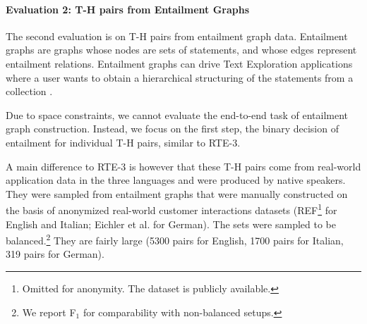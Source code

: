 \documentclass[11pt,letterpaper]{article}
\begin{document}
\paragraph{Evaluation 2: T-H pairs from Entailment Graphs} The second
evaluation is on T-H pairs from entailment graph data. Entailment
graphs are graphs whose nodes are sets of statements, and whose edges
represent entailment relations. Entailment graphs can drive Text
Exploration applications where a user wants to obtain a hierarchical
structuring of the statements from a collection
\cite{berant2012learning}.

Due to space constraints, we cannot evaluate the end-to-end task of
entailment graph construction. Instead, we focus on the first step,
the binary decision of entailment for individual T-H pairs, similar to
RTE-3.

A main difference to RTE-3 is however that these T-H pairs come from
real-world application data in the three languages and were produced
by native speakers. They were sampled from entailment graphs that were
manually constructed on the basis of anonymized real-world customer
interactions datasets (REF\footnote{Omitted for
  anonymity. The dataset is publicly available.} for English and
Italian; Eichler et al.  for German).  The
sets were sampled to be balanced.\footnote{We report F$_1$ for
  comparability with non-balanced setups.} They are fairly
large (5300 pairs for English, 1700 pairs for Italian, 319 pairs for
German).



\end{document}
